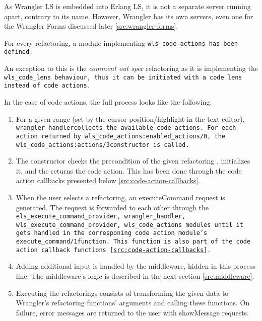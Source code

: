 \begin{note}
As Wrangler LS is embedded into Erlang LS, it is not a separate server running apart, contrary to its name. However, Wrangler has its own servers, even one for the Wrangler Forms discussed later \ref{src:wrangler-forms}.
\end{note}

For every refactoring, a module implementing \tt wls\_code\_actions\rm\ has been defined.

An exception to this is the \textit{comment out spec} refactoring as it is implementing the \tt wls\_code\_lens\rm\ behaviour, thus it can be initiated with a code lens instead of code actions. 


In the case of code actions, the full process looks like the following:
\begin{enumerate}
    \item For a given range (set by the cursor position/highlight in the text editor), \tt wrangler\_handler\rm collects the available code actions. For each action returned by \tt wls\_code\_actions:enabled\_actions/0\rm , the \tt wls\_code\_actions:actions/3\rm constructor is called.
    \item The constructor checks the precondition of the given refactoring , initializes it, and the returns the code action. This has been done through the code action callbacks presented below \ref{src:code-action-callbacks}.
    \item When the user selects a refactoring, an executeCommand request is generated. The request is forwarded to each other through the \tt els\_execute\_command\_provider, wrangler\_handler, wls\_execute\_command\_provider, wls\_code\_actions \rm modules until it gets handled in the corresponing code action module's \tt execute\_command/1\rm function. This function is also part of the code action callback functions \ref{src:code-action-callbacks}.
    \item Adding additional input is handled by the middleware, hidden in this process line. The middleware's logic is described in the next section \ref{src:middleware}.
    \item Executing the refactorings consists of transforming the given data to Wrangler's refactoring functions' arguments and calling these functions. On failure, error messages are returned to the user with showMessage requests. 
    
\end{enumerate}

